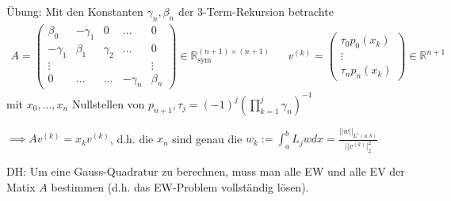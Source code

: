 Übung: Mit den Konstanten $\gamma_n, \beta_n$ der 3-Term-Rekursion betrachte
\begin{align*}
	A = \left(\begin{matrix}
		\beta_0   & -\gamma_1 & 0 & ... & 0\\
		-\gamma_1 & \beta_1   & \gamma_2 & ... & 0\\
		\vdots    & & & & \vdots \\
		0         & ... & ... & -\gamma_n & \beta_n
	\end{matrix}\right) \in \mathbb{R}^{(n+1)\times(n+1)}_{\text{sym}} &&
	v^{(k)} = \left(\begin{matrix}
		\tau_0 p_0(x_k)\\ \vdots\\ \tau_n p_n(x_k)
	\end{matrix}\right) \in \mathbb{R}^{n+1}
\end{align*}
mit $x_0, ..., x_n$ Nullstellen von $p_{n+1}, \tau_j = (-1)^j \left(\prod_{k=1}^{j} \gamma_n\right)^{-1}$

$\implies Av^{(k)} = x_k v^{(k)}$, d.h. die $x_n$ sind genau die $w_k := \int_{a}^{b} L_j w dx = \frac{||w||_{L^1(a,b)}}{||v^{(k)}|^2_2}$

DH: Um eine Gauss-Quadratur zu berechnen, muss man alle EW und alle EV der Matix $A$ bestimmen (d.h. das EW-Problem vollständig lösen).
